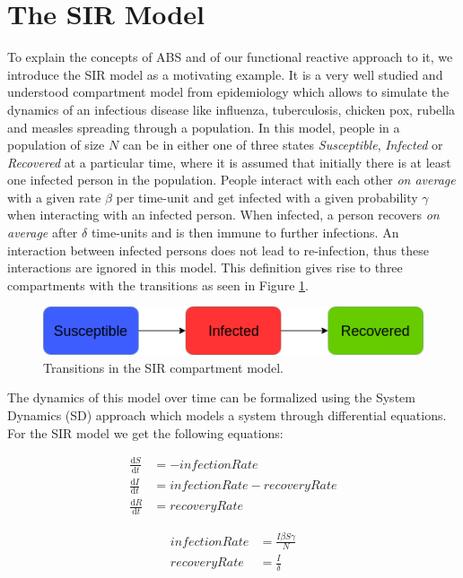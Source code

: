 \section{The SIR Model}
To explain the concepts of ABS and of our functional reactive approach to it, we introduce the SIR model as a motivating example. It is a very well studied and understood compartment model from epidemiology \cite{kermack_contribution_1927} which allows to simulate the dynamics of an infectious disease like influenza, tuberculosis, chicken pox, rubella and measles \cite{enns_its_2010} spreading through a population. In this model, people in a population of size $N$ can be in either one of three states \textit{Susceptible}, \textit{Infected} or \textit{Recovered} at a particular time, where it is assumed that initially there is at least one infected person in the population. People interact with each other \textit{on average} with a given rate $\beta$ per time-unit and get infected with a given probability $\gamma$ when interacting with an infected person. When infected, a person recovers \textit{on average} after $\delta$ time-units and is then immune to further infections. An interaction between infected persons does not lead to re-infection, thus these interactions are ignored in this model. This definition gives rise to three compartments with the transitions as seen in Figure \ref{fig:sir_transitions}.

\begin{figure}
	\centering
	\includegraphics[width=.4\textwidth, angle=0]{./shared/fig/diagrams/SIR_transitions.png}
	\caption{Transitions in the SIR compartment model.}
	\label{fig:sir_transitions}
\end{figure}

The dynamics of this model over time can be formalized using the System Dynamics (SD) approach \cite{porter_industrial_1962} which models a system through differential equations. For the SIR model we get the following equations:

\begin{align}
\frac{\mathrm d S}{\mathrm d t} &= -infectionRate \\ 
\frac{\mathrm d I}{\mathrm d t} &= infectionRate - recoveryRate \\ 
\frac{\mathrm d R}{\mathrm d t} &= recoveryRate 
\end{align}

\begin{align}
infectionRate &= \frac{I \beta S \gamma}{N} \\
recoveryRate &= \frac{I}{\delta} 
\end{align}

